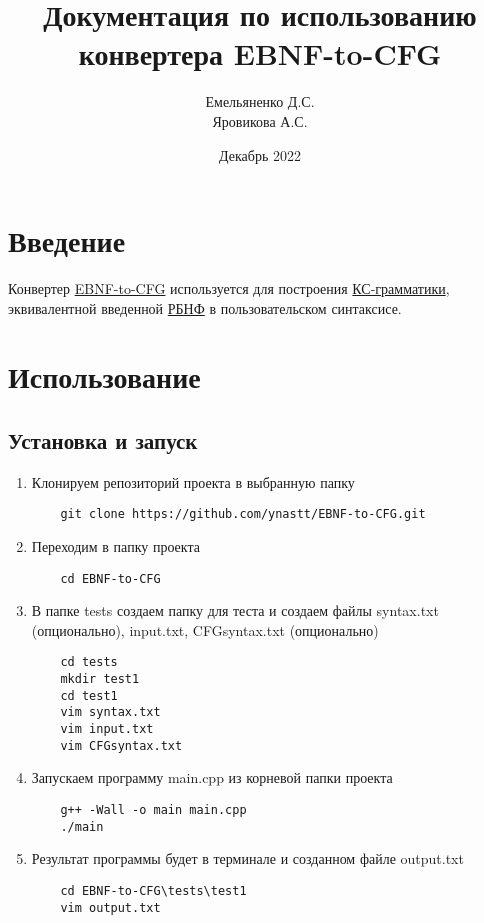 \documentclass{article}
\title{Документация по использованию конвертера
EBNF-to-CFG}
\author{Емельяненко Д.С.\\ Яровикова А.С.}
\date{Декабрь 2022}
\begin{document}
\maketitle


\section{Введение}
Конвертер \href{https://github.com/ynastt/EBNF-to-CFG}{EBNF-to-CFG} используется для построения \href{https://ru.wikipedia.org/wiki/Контекстно-свободная_грамматика}{КС-грамматики}, эквивалентной введенной \href{https://ru.wikipedia.org/wiki/Расширенная_форма_Бэкуса_—_Наура}{РБНФ} в пользовательском синтаксисе. 

\section{Использование}

\subsection{Установка и запуск}
\begin{enumerate}
    \item Клонируем репозиторий проекта в выбранную папку
    \begin{lstlisting}
    git clone https://github.com/ynastt/EBNF-to-CFG.git
    \end{lstlisting}
    \item Переходим в папку проекта
    \begin{lstlisting}
    cd EBNF-to-CFG
    \end{lstlisting}
    \item В папке tests создаем папку для теста и создаем файлы syntax.txt (опционально), input.txt, CFGsyntax.txt (опционально)
    \begin{lstlisting}
    cd tests
    mkdir test1
    cd test1
    vim syntax.txt
    vim input.txt
    vim CFGsyntax.txt
    \end{lstlisting} 
    \item Запускаем программу main.cpp из корневой папки проекта
    \begin{lstlisting}
    g++ -Wall -o main main.cpp
    ./main
    \end{lstlisting}
    \item Результат программы будет в терминале и созданном файле output.txt
    \begin{lstlisting}
    cd EBNF-to-CFG\tests\test1
    vim output.txt
    \end{lstlisting}
\end{enumerate}
\end{document}
